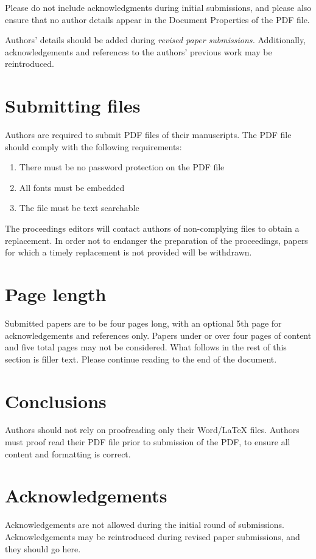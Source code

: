 \documentclass[a4paper]{article}
\begin{document}
Please do not include acknowledgments during initial submissions, and please also ensure that no author details appear in the Document Properties of the PDF file.

Authors' details should be added during \textit{revised paper submissions.} Additionally, acknowledgements and references to the authors' previous work may be reintroduced.

\section{Submitting files}
Authors are required to submit PDF files of their manuscripts. 
The PDF file should comply with the following requirements: 
\begin{enumerate}
\item There must be no password protection on the PDF file
\item All fonts must be embedded
\item The file must be text searchable
\end{enumerate}
The proceedings editors will contact authors of non-complying files to obtain a
replacement. In order not to endanger the preparation of the proceedings, 
papers for which a timely replacement is not provided will be withdrawn.

\section{Page length}

Submitted papers are to be four pages long, with an optional 5th page for acknowledgements and references only. Papers under or over four pages of content and five total pages may not be considered. What follows in the rest of this section is filler text.  Please continue reading to the end of the document.


\lipsum[1-5]


\section{Conclusions}

Authors should not rely on proofreading only their Word/LaTeX files.  Authors must proof read their PDF file prior to submission of the PDF, to ensure all content and formatting is correct.

\section{Acknowledgements}
Acknowledgements are not allowed during the initial round of submissions.  Acknowledgements may be reintroduced during revised paper submissions, and they should go here.
\end{document}
